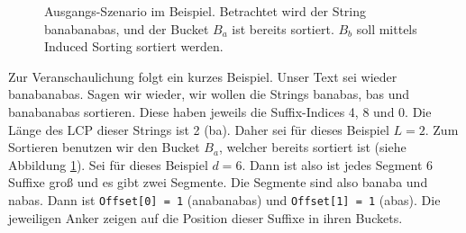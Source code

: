 \begin{figure}
\centering
{}
\caption{Ausgangs-Szenario im Beispiel. Betrachtet wird der String \glqq banabanabas\grqq, und der Bucket $B_a$ ist bereits sortiert. $B_b$ soll mittels Induced Sorting sortiert werden.}
\label{fg:beispiel}
\end{figure}

Zur Veranschaulichung folgt ein kurzes Beispiel. Unser Text sei wieder \glqq banabanabas\grqq.
Sagen wir wieder, wir wollen die Strings \glqq banabas\grqq, \glqq bas\grqq{} und \glqq banabanabas\grqq{} sortieren.
Diese haben jeweils die Suffix-Indices 4, 8 und 0.
Die Länge des LCP dieser Strings ist 2 (\glqq ba\grqq).
Daher sei für dieses Beispiel $L = 2$.
Zum Sortieren benutzen wir den Bucket $B_a$, welcher bereits sortiert ist (siehe Abbildung \ref{fg:beispiel}).
Sei für dieses Beispiel $d = 6$.
Dann ist also ist jedes Segment 6 Suffixe groß und es gibt zwei Segmente.
Die Segmente sind also \glqq banaba\grqq{} und \glqq nabas\grqq.
Dann ist \texttt{Offset[0] = 1} (\glqq anabanabas\grqq) und \texttt{Offset[1] = 1} (\glqq abas\grqq).
Die jeweiligen Anker zeigen auf die Position dieser Suffixe in ihren Buckets.

